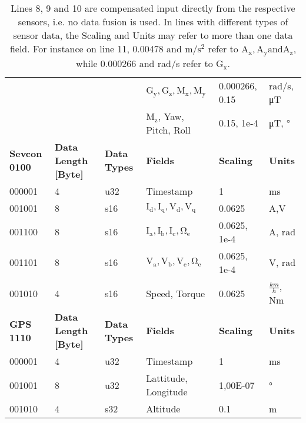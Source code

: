 \begin{landscape}
\begin{table}[H]
\begin{tabular}{@{\makebox[3em][r]{\rownumber\space}}|llllll}
&                      &                     & $\mathrm{G_y, G_z, M_x, M_y}$              & 0.000266, 0.15     & rad/s, \si{\micro \tesla}                       \\
&                      &                     & $\mathrm{M_z}$, Yaw, Pitch, Roll        & 0.15, 1e-4         & \si{\micro \tesla}, \si{\degree}                    \\
\hline
 \textbf{Sevcon 0100} & \textbf{Data Length [Byte]} & \textbf{Data Types} & \textbf{Fields}             & \textbf{Scaling}   & \textbf{Units}                                    \\
\hline
000001               & 4                    & u32                 & Timestamp                   & 1                  & ms                                                \\
001001               & 8                    & s16                 & $\mathrm{I_d,I_q,V_d,V_q}$                & 0.0625             & A,V                                               \\
001100               & 8                    & s16                 & $\mathrm{I_a, I_b, I_c, \Omega_e}$ & 0.0625, 1e-4       & A, rad                                            \\
001101               & 8                    & s16                 & $\mathrm{V_a, V_b, V_c, \Omega_e}$ & 0.0625, 1e-4       & V, rad                                            \\
001010               & 4                    & s16                 & Speed, Torque               & 0.0625             & $\frac{km}{h}$, Nm                              \\
\hline
\textbf{GPS 1110}    & \textbf{Data Length [Byte]} & \textbf{Data Types} & \textbf{Fields}             & \textbf{Scaling}   & \textbf{Units}                                    \\
\hline
000001               & 4                    & u32                 & Timestamp                   & 1                  & ms                                                \\
001001               & 8                    & u32                 & Lattitude, Longitude        & 1,00E-07           & \si{\degree} \\
001010               & 4                    & s32                 & Altitude                    & 0.1                & m                                                
      
	\end{tabular}
	\caption{Lines 8, 9 and 10 are compensated input directly from the respective sensors, i.e. no data fusion is used. 
	In lines with different types of sensor data, the Scaling and Units may refer to more than one data field.
	For instance on line 11, 0.00478 and $\si{\meter \per \second \squared}$ refer to $\mathrm{A_x, A_y and A_z}$, while 0.000266 and rad/s refer to $\mathrm{G_x}$.}
	\label{tab:OD}
\end{table}


\end{landscape}
